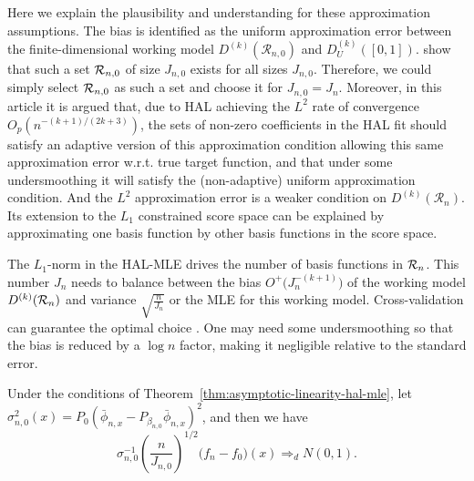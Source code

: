 Here we explain the plausibility and understanding for these approximation assumptions. The bias is identified as the uniform approximation error between the finite-dimensional working model $D^{(k)}(\mathcal R_{n,0})$ and $D^{(k)}_U([0,1])$. \citet[Appendices~D and~F]{vanderlaan2023higherordersplinehighly} show that such a set ${\cal R}_{n,0}$ of size $J_{n,0}$ exists for all sizes $J_{n,0}$. Therefore, we could simply select ${\cal R}_{n,0}$ as such a set and choose it for $J_{n,0}=J_n$.
Moreover, in this article it is argued that, due to HAL achieving the $L^2$ rate of convergence $O_p(n^{-(k+1)/(2k+3)})$, the sets of non-zero coefficients in the HAL fit should satisfy an adaptive version of this approximation condition allowing this same approximation error w.r.t. true target function, and that under some undersmoothing it will satisfy the (non-adaptive) uniform approximation condition. 
And the $L^2$ approximation error is a weaker condition on $D^{(k)}(\mathcal R_{n})$. Its extension to the $L_1$ constrained score space can be explained by approximating one basis function by other basis functions in the score space.

\begin{remark}
The $L_1$-norm in the HAL-MLE drives the number of basis functions in ${\cal R}_n$. This number $J_n$ needs to balance between the bias $O^+\bigl(J_{n}^{-(k+1)}\bigr)$ of the working model $D^{(k)}({\cal R}_n)$ and variance $\sqrt{\frac{n}{J_{n}}}$ or the MLE for this working model. Cross-validation can guarantee the optimal choice \citep{van2003unified, vaart2006oracle}. One may need some undersmoothing so that the bias is reduced by a $\log n$ factor, making it negligible relative to the standard error. 
\end{remark}


\begin{theorem}
\label{thm:density_HAL_asymptotic_normality}
Under the conditions of Theorem~\ref{thm:asymptotic-linearity-hal-mle}, let $\sigma^2_{n,0}(x)=P_0(\bar{\phi}_{n,x}-P_{\beta_{n,0}}\bar{\phi}_{n,x})^2$, and then we have
\begin{equation}
    {\sigma}_{n,0}^{-1} \left( \frac{n}{J_{n,0}} \right)^{1/2} \bigl(f_n - f_{{0}}\bigr)(x) \Rightarrow_d N(0,1).
\end{equation}
\end{theorem}

